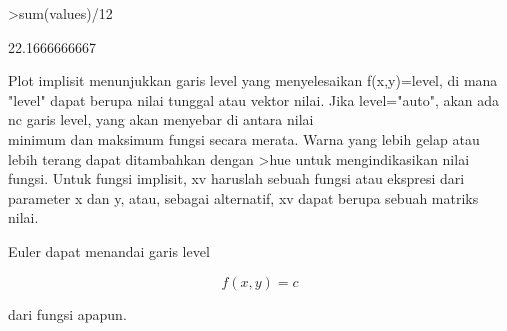 \documentclass{article}
\begin{document}
\begin{eulernotebook}
\begin{eulercomment}
\begin{eulercomment}
\begin{eulercomment}
\begin{eulercomment}
\begin{eulercomment}
\begin{eulercomment}
\begin{eulercomment}
\begin{eulercomment}
\begin{eulercomment}
\begin{eulercomment}
\begin{eulerprompt}
>sum(values)/12
\end{eulerprompt}
\begin{euleroutput}
  22.1666666667
\end{euleroutput}
\begin{eulercomment}
\begin{eulercomment}
\begin{eulercomment}
Plot implisit menunjukkan garis level yang menyelesaikan f(x,y)=level,
di mana "level" dapat berupa nilai tunggal atau vektor nilai. Jika
level="auto", akan ada nc garis level, yang akan menyebar di antara
nilai\\
minimum dan maksimum fungsi secara merata. Warna yang lebih gelap atau
lebih terang dapat ditambahkan dengan \textgreater{}hue untuk mengindikasikan nilai
fungsi. Untuk fungsi implisit, xv haruslah sebuah fungsi atau ekspresi
dari parameter x dan y, atau, sebagai alternatif, xv dapat berupa
sebuah matriks nilai.

Euler dapat menandai garis level

\end{eulercomment}
\begin{eulerformula}
\[
f(x,y) = c
\]
\end{eulerformula}
\begin{eulercomment}
dari fungsi apapun.


\end{eulercomment}
\end{eulercomment}
\end{eulercomment}
\end{eulercomment}
\end{eulercomment}
\end{eulercomment}
\end{eulercomment}
\end{eulercomment}
\end{eulercomment}
\end{eulercomment}
\end{eulercomment}
\end{eulercomment}
\end{eulercomment}
\end{eulernotebook}
\end{document}
